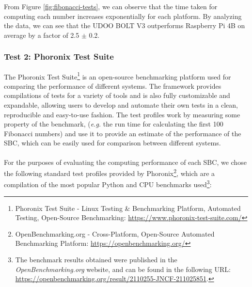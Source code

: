 From Figure \ref{fig:fibonacci-tests}, we can observe that the time taken for computing each number increases exponentially for each platform. By analyzing the data, we can see that the UDOO BOLT V3 outperforms Raspberry Pi 4B on average by a factor of 2.5 $\pm$ 0.2.

\subsubsection{Test 2: Phoronix Test Suite}

The Phoronix Test Suite\footnote{Phoronix Test Suite - Linux Testing \& Benchmarking Platform, Automated Testing, Open-Source Benchmarking: \url{https://www.phoronix-test-suite.com/}} is an open-source benchmarking platform used for comparing the performance of different systems. The framework provides compilations of tests for a variety of tools and is also fully customizable and expandable, allowing users to develop and automate their own tests in a clean, reproducible and easy-to-use fashion. The test profiles work by measuring some property of the benchmark, (\textit{e.g.} the run time for calculating the first 100 Fibonacci numbers) and use it to provide an estimate of the performance of the \acs{SBC}, which can be easily used for comparison between different systems. 

\paragraph{} For the purposes of evaluating the computing performance of each \acs{SBC}, we chose the following standard test profiles provided by Phoronix\footnote{OpenBenchmarking.org - Cross-Platform, Open-Source Automated Benchmarking Platform: \url{https://openbenchmarking.org/}}, which are a compilation of the most popular Python and CPU benchmarks used\footnote{The benchmark results obtained were published in the \textit{OpenBenchmarking.org} website, and can be found in the following URL: \url{https://openbenchmarking.org/result/2110255-JNCF-211025851}.}:

